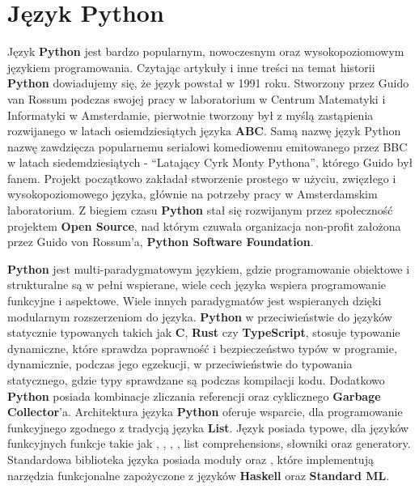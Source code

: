 


\section{Język Python}
Język \textbf{Python} \cite{IntroducingPython} \cite{AdvancedPythonDevelopment} \cite{ExpertPythonProgramming} jest bardzo popularnym, nowoczesnym oraz wysokopoziomowym językiem programowania. Czytając artykuły i inne treści na temat historii \textbf{Python} \cite{HistoriaPythona} \cite{WikipediaPythonProgrammingLanauge} dowiadujemy się, że język powstał w 1991 roku. Stworzony przez Guido van Rossum podczas swojej pracy w laboratorium w Centrum Matematyki i Informatyki w Amsterdamie, pierwotnie tworzony był z myślą zastąpienia rozwijanego w latach osiemdziesiątych języka \textbf{ABC}. Samą nazwę język Python nazwę zawdzięcza popularnemu serialowi komediowemu emitowanego przez BBC w latach siedemdziesiątych - ``Latający Cyrk Monty Pythona'', którego Guido był fanem.
Projekt początkowo zakładał stworzenie prostego w użyciu, zwięzłego i wysokopoziomowego języka, głównie na potrzeby pracy w Amsterdamskim laboratorium. Z biegiem czasu \textbf{Python} stał się rozwijanym przez społeczność projektem \textbf{Open Source}, nad którym czuwała organizacja non-profit założona przez Guido von Rossum'a, \textbf{Python Software Foundation}.

\textbf{Python} jest multi-paradygmatowym językiem, gdzie programowanie obiektowe i strukturalne są w pełni wspierane, wiele cech języka wspiera programowanie funkcyjne i aspektowe. Wiele innych paradygmatów jest wspieranych dzięki modularnym rozszerzeniom do języka.
\textbf{Python} w przeciwieństwie do języków statycznie typowanych takich jak \textbf{C}, \textbf{Rust} czy \textbf{TypeScript}, stosuje typowanie dynamiczne, które sprawdza poprawność i bezpieczeństwo typów w programie, dynamicznie, podczas jego egzekucji, w przeciwieństwie do typowania statycznego, gdzie typy sprawdzane są podczas kompilacji kodu. Dodatkowo \textbf{Python} posiada kombinacje zliczania referencji oraz cyklicznego \textbf{Garbage Collector}'a.
Architektura języka \textbf{Python} oferuje wsparcie, dla programowanie funkcyjnego zgodnego z tradycją języka \textbf{List}. Język posiada typowe, dla języków funkcyjnych funkcje takie jak , , , , list comprehensions, słowniki oraz generatory. Standardowa biblioteka języka posiada moduły  oraz , które implementują narzędzia funkcjonalne zapożyczone z języków \textbf{Haskell} oraz \textbf{Standard ML}.

